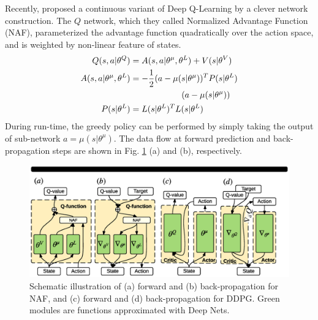 \documentclass[../thesis.tex]{subfiles}
\begin{document}

Recently, \citet{CDQN} proposed a continuous variant of Deep Q-Learning by a clever network construction. The $Q$ network, which they called Normalized Advantage Function (NAF), parameterized the advantage function quadratically over the action space, and is weighted by non-linear feature of states. 
\begin{align}
\centering
Q(s,a|\theta^Q) &= A(s,a | \theta^\mu, \theta^L) + V(s|\theta^V) \\
A(s,a | \theta^\mu, \theta^L) &= -\frac{1}{2}(a-\mu(s|\theta^\mu))^T P(s|\theta^L)\nonumber \\
&\qquad \qquad \qquad(a-\mu(s|\theta^\mu)) \label{equ:NAF} \\
P(s|\theta^L) &= L(s|\theta^L)^TL(s|\theta^L) \label{equ:P}
\end{align}
During run-time, the greedy policy can be performed by simply taking the output of sub-network $a = \mu(s|\theta^\mu)$. The data flow at forward prediction and back-propagation steps are shown in Fig. \ref{fig:CDQN-DDPG} (a) and (b), respectively.

\begin{figure}[t]
\begin{center}
\centerline{\includegraphics[width=\columnwidth,trim= 80 900 110 70, clip=true]{./MultimodalDRL/fig/naf_ddpg}}
\caption{Schematic illustration of (a) forward and (b) back-propagation for NAF, and (c) forward and (d) back-propagation for DDPG. Green modules are functions approximated with Deep Nets.}
\label{fig:CDQN-DDPG}
\end{center}
\end{figure} 
\end{document}
